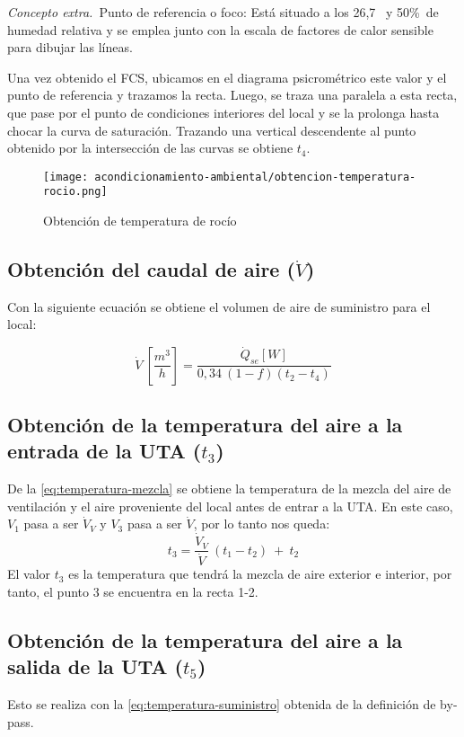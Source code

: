 \emph{Concepto extra.}\ Punto de referencia o foco: Est\'a situado a los 26,7 \textcelsius\ y 50\%\ de humedad relativa y se emplea junto con la escala de factores de calor sensible para dibujar las l\'ineas. 

Una vez obtenido el FCS, ubicamos en el diagrama psicrom\'etrico este valor y el punto de referencia y trazamos la recta. Luego, se traza una paralela a esta recta, que pase por el punto de condiciones interiores del local y se la prolonga hasta chocar la curva de saturaci\'on. Trazando una vertical descendente al punto obtenido por la intersecci\'on de las curvas se obtiene $t_4$.

\begin{figure}[H]
	\centering
	\texttt{[image: acondicionamiento-ambiental/obtencion-temperatura-rocio.png]}
	\caption{Obtenci\'on de temperatura de roc\'io}
	\label{fig:obtencion-temperatura-rocio}
\end{figure}

\subsection{Obtenci\'on del caudal de aire ($\dot{V}$)}

Con la siguiente ecuaci\'on se obtiene el volumen de aire de suministro para el local:

\begin{equation*}
	\dot{V}\ [\frac{m^3}{h}]= \frac{\dot{Q}_{se}[W]}{0,34\ (1-f)(t_2-t_4)}
\end{equation*}

\subsection{Obtenci\'on de la temperatura del aire a la entrada de la UTA ($t_3$)}
De la \autoref{eq:temperatura-mezcla} se obtiene la temperatura de la mezcla del aire de ventilaci\'on y el aire proveniente del local antes de entrar a la UTA. En este caso, $V_1$ pasa a ser $\dot{V}_V$ y $V_3$ pasa a ser $\dot{V}$, por lo tanto nos queda:
\begin{equation*}
	t_3=\frac{\dot{V}_V}{\dot{V}}\ (t_1-t_2)\ +\ t_2
\end{equation*}
El valor $t_3$ es la temperatura que tendr\'a la mezcla de aire exterior e interior, por tanto, el punto 3 se encuentra en la recta 1-2. 
\subsection{Obtenci\'on de la temperatura del aire a la salida de la UTA ($t_5$)}
Esto se realiza con la \autoref{eq:temperatura-suministro} obtenida de la definici\'on de by-pass.

